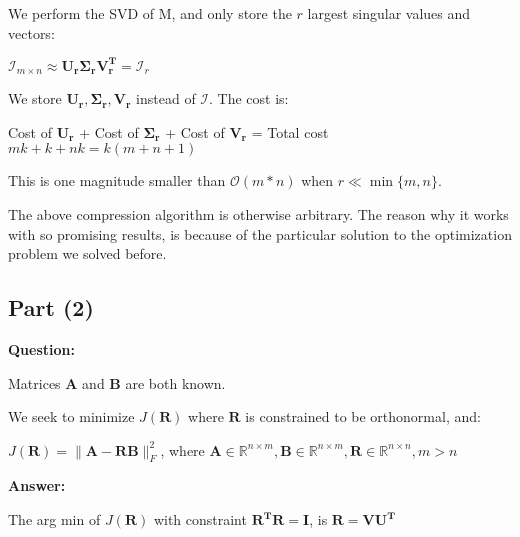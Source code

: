 \documentclass[fleqn, 11pt]{article}
\newcommand{\bs}[1]{\boldsymbol{#1}}
\begin{document}
\smallskip

We perform the SVD of M, and only store the $r$ largest singular values and vectors:

\begin{center}
    $\mathcal{I}_{m \times n} \approx \bs{U_r \Sigma_r V_r ^T } = \mathcal{I}_r  $
\end{center}

We store $\bs{U_r,  \Sigma_r,  V_r }$ instead of  $\mathcal{I}$. The cost is:

\begin{center}
    Cost of $\bs{U_r}$ +  Cost of $\bs{\Sigma_r}$ +  Cost of $\bs{V_r}$  = Total cost \\
    $mk + k + nk = k (m+n+1)$
\end{center}

This is one magnitude smaller than $\mathcal{O}(m*n)$ when $r \ll \min\{m,n\}$. 

The above compression algorithm is otherwise arbitrary. 
The reason why it works with so promising results, is because of  
the particular solution to the optimization problem we solved before.



\newpage

\subsection*{Part (2) }

\textbf{Question: }

\smallskip

Matrices $\boldsymbol{A}$ and $\boldsymbol{B}$ are both known.

\smallskip

We seek to minimize $J(\boldsymbol{R})$ where  $\boldsymbol{R}$ is constrained to be orthonormal, and: 
\begin{center}
    $J(\boldsymbol{R}) = \|\boldsymbol{A}-\boldsymbol{R} \boldsymbol{B}\|^2_F$, where $\boldsymbol{A} \in \mathbb{R}^{n \times m}, \boldsymbol{B} \in \mathbb{R}^{n \times m}, \boldsymbol{R} \in \mathbb{R}^{n \times n}, m > n$ 

\end{center}
\hrulefill

\medskip

\textbf{Answer: }

\medskip

The arg min of $J(\boldsymbol{R})$ with constraint $\bs{R^TR=I}$,  
is $\bs{R=VU^T}$ 

\smallskip
\end{document}
